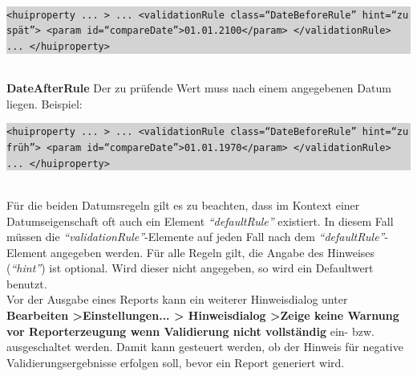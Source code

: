 \documentclass[a4paper,10pt]{book}
\begin{document}
\newline\\
\colorbox{lightgray}{\parbox{\textwidth}{
{\tt <huiproperty ... >\newline
   ...\newline
   <validationRule class=``DateBeforeRule'' hint=``zu spät''>\newline
      <param id=``compareDate''>01.01.2100</param>\newline
   </validationRule>\newline
   ...\newline
</huiproperty>}
}}
\newline\\
\textbf{DateAfterRule}
\newline
Der zu prüfende Wert muss nach einem angegebenen Datum liegen.
\newline
Beispiel:
\newline\\
\colorbox{lightgray}{\parbox{\textwidth}{
{\tt <huiproperty ... >\newline
   ...\newline
   <validationRule class=``DateBeforeRule'' hint=``zu früh''>\newline
      <param id=``compareDate''>01.01.1970</param>\newline
   </validationRule>\newline
   ...\newline
</huiproperty>}
}}
\newline\\
Für die beiden Datumsregeln gilt es zu beachten, dass im Kontext einer Datumseigenschaft oft auch ein Element
\textit{``defaultRule''} existiert. In diesem Fall müssen die \textit{``validationRule''}-Elemente auf jeden Fall
nach dem \textit{``defaultRule''}-Element angegeben werden.
\newline
Für alle Regeln gilt, die Angabe des Hinweises (\textit{``hint''}) ist optional. Wird dieser nicht angegeben, so wird ein Defaultwert benutzt.
\newline\\
Vor der Ausgabe eines Reports kann ein weiterer Hinweisdialog unter \textbf{Bearbeiten \textgreater Einstellungen... \textgreater
Hinweisdialog \textgreater Zeige keine Warnung vor Reporterzeugung wenn Validierung nicht vollständig} ein- bzw. ausgeschaltet werden.
Damit kann gesteuert werden, ob der Hinweis für negative Validierungsergebnisse erfolgen soll, bevor ein Report generiert wird.
\end{document}
